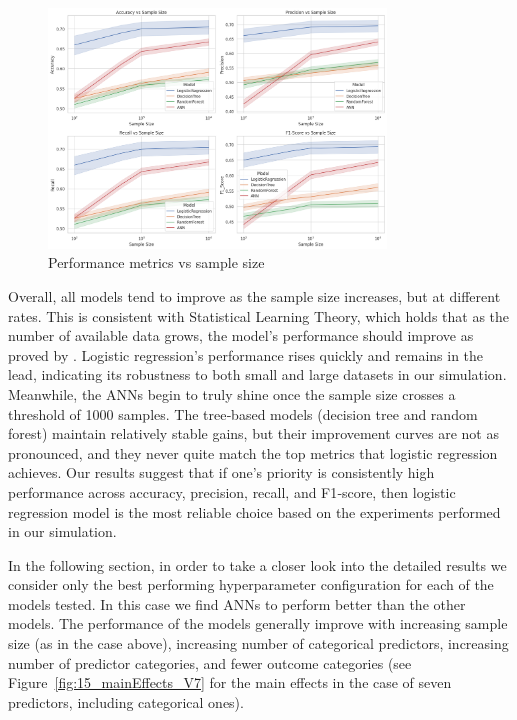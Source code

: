 \documentclass[12pt]{article}
\begin{document}
\begin{figure}[h]
 \centering
    \includegraphics[width=0.8\textwidth]{fig/metrics vs sample size.png}
    \caption{Performance metrics vs sample size}
    \label{fig:metrics_samplesize}
\end{figure}

Overall, all models tend to improve as the sample size increases, but at different rates. This is consistent with Statistical Learning Theory, which holds that as the number of available data grows, the model’s performance should improve as proved by \textcite{Vapnik2015}. Logistic regression’s performance rises quickly and remains in the lead, indicating its robustness to both small and large datasets in our simulation. Meanwhile, the ANNs begin to truly shine once the sample size crosses a threshold of 1000 samples. The tree‐based models (decision tree and random forest) maintain relatively stable gains, but their improvement curves are not as pronounced, and they never quite match the top metrics that logistic regression achieves. Our results suggest that if one’s priority is consistently high performance across accuracy, precision, recall, and F1‐score, then logistic regression model is the most reliable choice based on the experiments performed in our simulation.

In the following section, in order to take a closer look into the detailed results we consider only the best performing hyperparameter configuration for each of the models tested. In this case we find ANNs to perform better than the other models. The performance of the models generally improve with increasing sample size (as in the case above), increasing number of categorical predictors, increasing number of predictor categories, and fewer outcome categories (see Figure~\ref{fig:15_mainEffects_V7} for the main effects in the case of seven predictors, including categorical ones).
\end{document}
